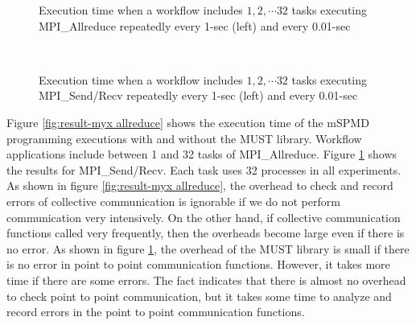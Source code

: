 \documentclass[graybox]{svmult}
\begin{document}
\begin{figure}[t]
 \begin{center}
\caption{Execution time when a workflow includes $1, 2, \cdots 32$ tasks executing MPI\_Allreduce repeatedly every 1-sec (left) and every 0.01-sec }
\label{fig:result-myx allreduce}
~\\
\caption{Execution time when a workflow includes $1, 2, \cdots 32$ tasks executing MPI\_Send/Recv repeatedly every 1-sec (left) and every 0.01-sec }
\label{fig:result-myx pingpong}
 \end{center}
\end{figure}

Figure \ref{fig:result-myx allreduce} shows the execution time of the mSPMD programming executions with and without the MUST library. Workflow applications include between 1 and 32 tasks of MPI\_Allreduce. 
Figure \ref{fig:result-myx pingpong} shows the results for MPI\_Send/Recv. 
Each task uses 32 processes in all experiments. 
As shown in figure \ref{fig:result-myx allreduce}, the overhead to check and record errors of collective communication is ignorable if we do not perform communication very intensively. On the other hand, if collective communication functions called very frequently, then the overheads become large even if there is no error. 
As shown in figure \ref{fig:result-myx pingpong}, the overhead of the MUST library is small if there is no error in point to point communication functions.  However, it takes more time if there are some errors. The fact indicates that there is almost no overhead to check point to point communication, but it takes some time to analyze and record errors in the point to point communication functions. 
\end{document}
